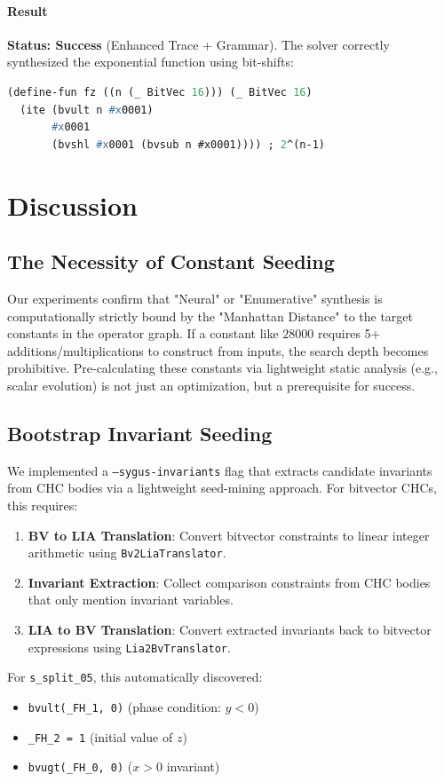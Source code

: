 \documentclass{article}
\begin{document}
\paragraph{Result}
\textbf{Status: Success} (Enhanced Trace + Grammar).
The solver correctly synthesized the exponential function using bit-shifts:
\begin{lstlisting}[language=Lisp]
(define-fun fz ((n (_ BitVec 16))) (_ BitVec 16) 
  (ite (bvult n #x0001) 
       #x0001 
       (bvshl #x0001 (bvsub n #x0001)))) ; 2^(n-1)
\end{lstlisting}

\section{Discussion}
\subsection{The Necessity of Constant Seeding}
Our experiments confirm that "Neural" or "Enumerative" synthesis is computationally strictly bound by the "Manhattan Distance" to the target constants in the operator graph. If a constant like $28000$ requires 5+ additions/multiplications to construct from inputs, the search depth becomes prohibitive. Pre-calculating these constants via lightweight static analysis (e.g., scalar evolution) is not just an optimization, but a prerequisite for success.

\subsection{Bootstrap Invariant Seeding}
We implemented a \texttt{--sygus-invariants} flag that extracts candidate invariants from CHC bodies via a lightweight seed-mining approach. For bitvector CHCs, this requires:
\begin{enumerate}
    \item \textbf{BV to LIA Translation}: Convert bitvector constraints to linear integer arithmetic using \texttt{Bv2LiaTranslator}.
    \item \textbf{Invariant Extraction}: Collect comparison constraints from CHC bodies that only mention invariant variables.
    \item \textbf{LIA to BV Translation}: Convert extracted invariants back to bitvector expressions using \texttt{Lia2BvTranslator}.
\end{enumerate}

For \texttt{s\_split\_05}, this automatically discovered:
\begin{itemize}
    \item \texttt{bvult(\_FH\_1, 0)} (phase condition: $y < 0$)
    \item \texttt{\_FH\_2 = 1} (initial value of $z$)
    \item \texttt{bvugt(\_FH\_0, 0)} ($x > 0$ invariant)
\end{itemize}
\end{document}
